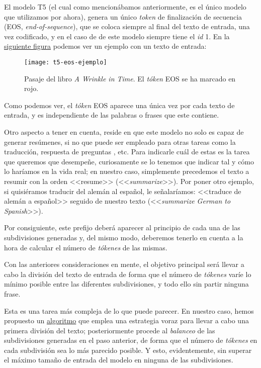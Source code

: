 El modelo T5 (el cual como mencionábamos anteriormente, es el único modelo que utilizamos por ahora), genera un único \emph{token} de finalización de secuencia (EOS, \emph{end-of-sequence}), que se coloca siempre al final del texto de entrada, una vez codificado, y en el caso de de este modelo siempre tiene el \emph{id} 1. En la \hyperref[fig:t5-eos-ejemplo]{siguiente figura} podemos ver un ejemplo con un texto de entrada:

\begin{figure}[h]
	\centering
	\texttt{[image: t5-eos-ejemplo]}
	\caption{Pasaje del libro \emph{A Wrinkle in Time}. El \emph{tóken} EOS se ha marcado en rojo.}
	\label{fig:t5-eos-ejemplo}
\end{figure}

Como podemos ver, el \emph{tóken} EOS aparece una única vez por cada texto de entrada, y es independiente de las palabras o frases que este contiene.

Otro aspecto a tener en cuenta, reside en que este modelo no solo es capaz de generar resúmenes, si no que puede ser empleado para otras tareas como la traducción, respuesta de preguntas \cite{raffel19}, etc. Para indicarle cuál de estas es la tarea que queremos que desempeñe, curiosamente se lo tenemos que indicar tal y cómo lo haríamos en la vida real; en nuestro caso, simplemente precedemos el texto a resumir con la orden <<resume>> (<<\emph{summarize}>>). Por poner otro ejemplo, si quisiéramos traducir del alemán al español, le señalaríamos: <<traduce de alemán a español>> seguido de nuestro texto (<<\emph{summarize German to Spanish}>>).

Por consiguiente, este prefijo deberá aparecer al principio de cada una de las subdivisiones generadas y, del mismo modo, deberemos tenerlo en cuenta a la hora de calcular el número de \emph{tókenes} de las mismas.

Con las anteriores consideraciones en mente, el objetivo principal será llevar a cabo la división del texto de entrada de forma que el número de \emph{tókenes} varíe lo mínimo posible entre las diferentes subdivisiones, y todo ello sin partir ninguna frase.

Esta es una tarea más compleja de lo que puede parecer. En nuestro caso, hemos propuesto un \hyperref[alg:division-codificacion]{algoritmo} que emplea una estrategia voraz para llevar a cabo una primera división del texto; posteriormente procede al \emph{balanceo} de las subdivisiones generadas en el paso anterior, de forma que el número de \emph{tókenes} en cada subdivisión sea lo más parecido posible. Y esto, evidentemente, sin superar el máximo tamaño de entrada del modelo en ninguna de las subdivisiones.

